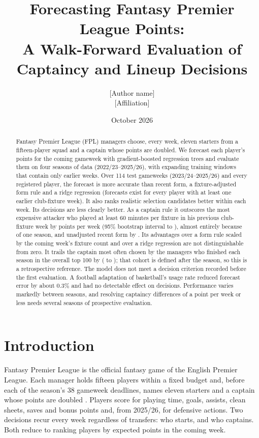 \documentclass[11pt,a4paper]{article}
\title{Forecasting Fantasy Premier League Points:\\
A Walk-Forward Evaluation of Captaincy and Lineup Decisions}
\author{[Author name]\\[2pt]\small [Affiliation]}
\date{October 2026}
\begin{document}
\maketitle

\begin{abstract}
\noindent
Fantasy Premier League (FPL) managers choose, every week, eleven starters from a fifteen-player
squad and a captain whose points are doubled. We forecast each player's points for the coming
gameweek with gradient-boosted regression trees and evaluate them on four seasons of data
(2022/23--2025/26), with expanding training windows that contain only earlier weeks. Over 114
test gameweeks (2023/24--2025/26) and every registered player, the forecast is more accurate than
recent form, a fixture-adjusted form rule and a ridge regression (forecasts exist for every player
with at least one earlier club-fixture week). It also ranks realistic
selection candidates better within each week. Its decisions are less clearly better. As a captain
rule it outscores the most expensive attacker who played at least 60 minutes per fixture in his
previous club-fixture week by \vsPremiumMean{}
points per week (95\% bootstrap interval \vsPremiumLow{} to \vsPremiumHigh{}), almost entirely
because of one season, and unadjusted recent form by \vsFormMean{}. Its advantages over a form
rule scaled by the coming week's fixture count and over a ridge regression are not distinguishable
from zero. It trails the captain most often chosen by the managers who finished each season in the
overall top 100 by \vsEliteMean{} (\vsEliteLow{} to \vsEliteHigh{}); that cohort is defined after
the season, so this is a retrospective reference. The model does not meet a decision criterion
recorded before the first evaluation. A football adaptation of basketball's usage rate reduced
forecast error by about 0.3\% and had no detectable effect on decisions. Performance varies
markedly between seasons, and resolving captaincy differences of a point per week or less needs
several seasons of prospective evaluation.
\end{abstract}

\section{Introduction}

Fantasy Premier League is the official fantasy game of the English Premier League. Each manager
holds fifteen players within a fixed budget and, before each of the season's 38 gameweek
deadlines, names eleven starters and a captain whose points are doubled \citep{fplrules}. Players
score for playing time, goals, assists, clean sheets, saves and bonus points and, from 2025/26,
for defensive actions. Two decisions recur every week regardless of transfers: who starts, and
who captains. Both reduce to ranking players by expected points in the coming week.
\end{document}
